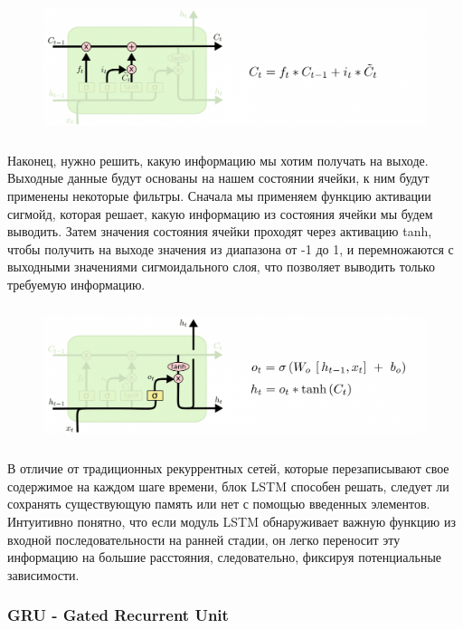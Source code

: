     \begin{figure}[ht!]
		\centering
		\captionsetup{justification=centering}
		\includegraphics[height=40mm]{img/LSTM_step3.png}
	\end{figure}
	
	Наконец, нужно решить, какую информацию мы хотим получать на выходе. Выходные данные будут основаны на нашем состоянии ячейки, к ним будут применены некоторые фильтры. Сначала мы применяем функцию активации сигмойд, которая решает, какую информацию из состояния ячейки мы будем выводить. Затем значения состояния ячейки проходят через активацию tanh, чтобы получить на выходе значения из диапазона от -1 до 1, и перемножаются с выходными значениями сигмоидального слоя, что позволяет выводить только требуемую информацию.

    \begin{figure}[ht!]
		\centering
		\captionsetup{justification=centering}
		\includegraphics[height=40mm]{img/LSTM_step4.png}
	\end{figure}
	
	В отличие от традиционных рекуррентных сетей, которые перезаписывают свое содержимое на каждом шаге времени, блок LSTM способен решать, следует ли сохранять существующую память или нет с помощью введенных элементов. Интуитивно понятно, что если модуль LSTM обнаруживает важную функцию из входной последовательности на ранней стадии, он легко переносит эту информацию на большие расстояния, следовательно, фиксируя потенциальные зависимости.
	
	\subsubsection{GRU - Gated Recurrent Unit}
	
